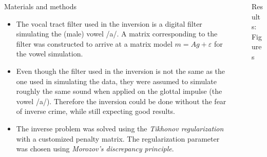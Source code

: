 \documentclass[final]{beamer}
\newcommand{\eps}{\ensuremath{\varepsilon}}
\begin{document}
\begin{frame}[t]
\begin{columns}[t]
\begin{column}{.465\textwidth}
\begin{block}{Materials and methods}
\begin{itemize}
\item The vocal tract filter used in the inversion is a digital filter simulating the (male) vowel /a/. A matrix corresponding to the filter was constructed to arrive at a matrix model $m = A g + \eps$ for the vowel simulation.

\item Even though the filter used in the inversion is not the same as the one used in simulating the data, they were assumed to simulate roughly the same sound when applied on the glottal impulse (the vowel /a/). Therefore the inversion could be done without the fear of inverse crime, while still expecting good results.

\item The inverse problem was solved using the \emph{Tikhonov regularization} with a customized penalty matrix. The regularization parameter was chosen using \emph{Morozov's discrepancy principle}.

\end{itemize}

\end{block}


\end{column} %

\begin{column}{.03\textwidth}\end{column} %
 
\begin{column}{.465\textwidth} %



\begin{block}{Results: Figures}


\begin{columns}


\end{columns}
\end{block}
\end{column}
\end{columns}
\end{frame}
\end{document}
